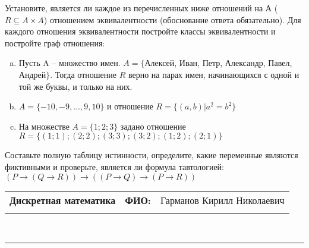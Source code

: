 \documentclass[10pt]{exam}
\newcommand{\class}{Дискретная математика}
\newcommand{\examdate}{}
\begin{document}
\begin{questions}
\question
Установите, является ли каждое из перечисленных ниже отношений на А ($R \subseteq A \times A$) отношением эквивалентности (обоснование ответа обязательно). Для каждого отношения эквивалентности постройте классы 
эквивалентности и постройте граф отношения:
\begin{enumerate} [a)]\setcounter{enumi}{0}
\item Пусть A – множество имен. $A = \{ $Алексей, Иван, Петр, Александр, Павел, Андрей$ \}$. Тогда отношение $R$ верно на парах имен, начинающихся с одной и той же буквы, и только на них.
\item $A = \{-10, -9, … , 9, 10\}$ и отношение $ R = \{(a,b)|a^{2} = b^{2}\}$
\item На множестве $A = \{1; 2; 3\}$ задано отношение $R = \{(1; 1); (2; 2); (3; 3); (3; 2); (1; 2); (2; 1)\}$
\end{enumerate}\question Составьте полную таблицу истинности, определите, какие переменные являются фиктивными и проверьте, является ли формула тавтологией:
$(P \rightarrow (Q \rightarrow R)) \rightarrow ((P \rightarrow Q) \rightarrow (P \rightarrow R))$

\end{questions}
\newpage
\begin{flushright}
\begin{tabular}{p{2.8in} r l}
\textbf{\class} & \textbf{ФИО:} &Гарманов Кирилл Николаевич
\\

\textbf{\examdate} &&\\
\end{tabular}\\
\end{flushright}
\rule[1ex]{\textwidth}{.1pt}
\end{document}
